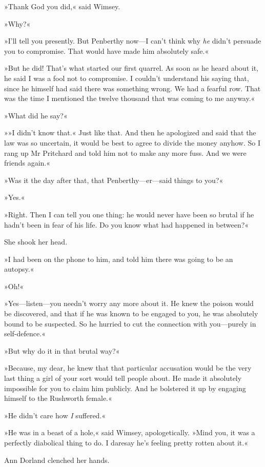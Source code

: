 »Thank God you did,« said Wimsey.

»Why?«

»I'll tell you presently. But Penberthy now—I can't think why \textit{he} didn't persuade you to compromise. That would have made him absolutely safe.«

»But he did! That's what started our first quarrel. As soon as he heard about it, he said I was a fool not to compromise. I couldn't understand his saying that, since he himself had said there was something wrong. We had a fearful row. That was the time I mentioned the twelve thousand that was coming to me anyway.«

»What did he say?«

»»I didn't know that.« Just like that. And then he apologized and said that the law was so uncertain, it would be best to agree to divide the money anyhow. So I rang up Mr Pritchard and told him not to make any more fuss. And we were friends again.«

»Was it the day after that, that Penberthy—er—said things to you?«

»Yes.«

»Right. Then I can tell you one thing: he would never have been so brutal if he hadn't been in fear of his life. Do you know what had happened in between?«

She shook her head.

»I had been on the phone to him, and told him there was going to be an autopsy.«

»Oh!«

»Yes—listen—you needn't worry any more about it. He knew the poison would be discovered, and that if he was known to be engaged to you, he was absolutely bound to be suspected. So he hurried to cut the connection with you—purely in self-defence.«

»But why do it in that brutal way?«

»Because, my dear, he knew that that particular accusation would be the very last thing a girl of your sort would tell people about. He made it absolutely impossible for you to claim him publicly. And he bolstered it up by engaging himself to the Rushworth female.«

»He didn't care how \textit{I} suffered.«

»He was in a beast of a hole,« said Wimsey, apologetically. »Mind you, it was a perfectly diabolical thing to do. I daresay he's feeling pretty rotten about it.«

Ann Dorland clenched her hands.

